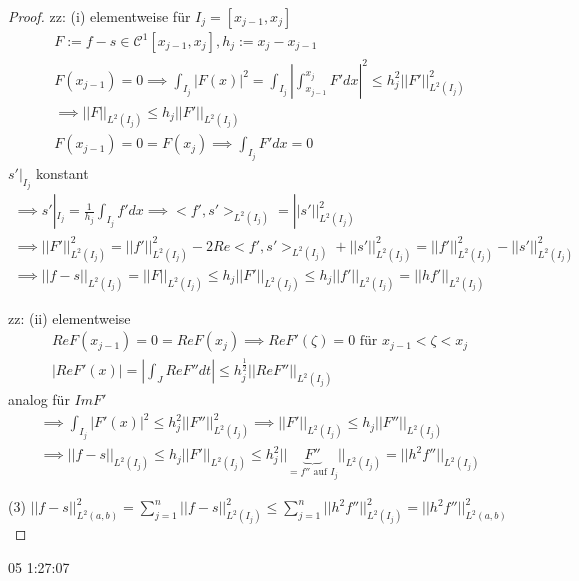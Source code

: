 \begin{proof}
	zz: (i) elementweise für $I_j = [x_{j-1}, x_j]$
	\begin{align*}
		F := f-s \in \mathcal{C}^1[x_{j-1}, x_j], h_j := x_j - x_{j-1}\\
		F(x_{j-1}) = 0 \implies \int_{I_j} |F(x)|^2 = \int_{I_j} \left|\int_{x_{j-1}}^{x_j} F' dx \right|^2 \leq h_j^2 ||F'||_{L^2(I_j)}^2\\
		\implies ||F||_{L^2(I_j)} \leq h_j ||F'||_{L^2(I_j)}\\
		F(x_{j-1}) = 0 = F(x_j) \implies \int_{I_j}F' dx = 0
	\end{align*}
	$s'|_{I_j}$ konstant
	\begin{align*}
		\implies s'|_{I_j} = \frac{1}{h_j} \int_{I_j}f' dx \implies <f', s'>_{L^2(I_j)} = ||s'||_{L^2(I_j)}^2\\
		\implies ||F'||_{L^2(I_j)}^2 = ||f'||_{L^2(I_j)}^2 - 2 Re<f', s'>_{L^2(I_j)} + ||s'||_{L^2(I_j)}^2 = ||f'||_{L^2(I_j)}^2 - ||s'||_{L^2(I_j)}^2\\
		\implies ||f-s||_{L^2(I_j)} = ||F||_{L^2(I_j)} \leq h_j ||F'||_{L^2(I_j)} \leq h_j ||f'||_{L^2(I_j)} = ||hf'||_{L^2(I_j)}
	\end{align*}
	
	zz: (ii) elementweise
	\begin{align*}
		Re F(x_{j-1}) = 0 = ReF(x_j) \implies Re F'(\zeta) = 0 \text{ für } x_{j-1} < \zeta < x_j\\
		|Re F'(x)| = | \int_{J} Re F'' dt| \leq h_j^{\frac{1}{2}} ||Re F''||_{L^2(I_j)}
	\end{align*}
	analog für $Im F'$
	\begin{align*}
		\implies \int_{I_j}|F'(x)|^2 \leq h_j^2 ||F''||_{L^2(I_j)}^2 \implies ||F'||_{L^2(I_j)} \leq h_j ||F''||_{L^2(I_j)}\\
		\implies ||f-s||_{L^2(I_j)} \leq h_j ||F'||_{L^2(I_j)} \leq h_j^2 ||\underbrace{F''}_{= f'' \text{ auf } I_j}||_{L^2(I_j)} = ||h^2 f''||_{L^2(I_j)}
	\end{align*}
	
	(3) $||f-s||_{L^2(a,b)}^2 = \sum_{j=1}^{n} ||f-s||_{L^2(I_j)}^2 \leq \sum_{j=1}^{n} ||h^2 f''||_{L^2(I_j)}^2 = ||h^2 f''||_{L^2(a,b)}^2$
\end{proof}

\begin{def}
	05 1:27:07
\end{def}
